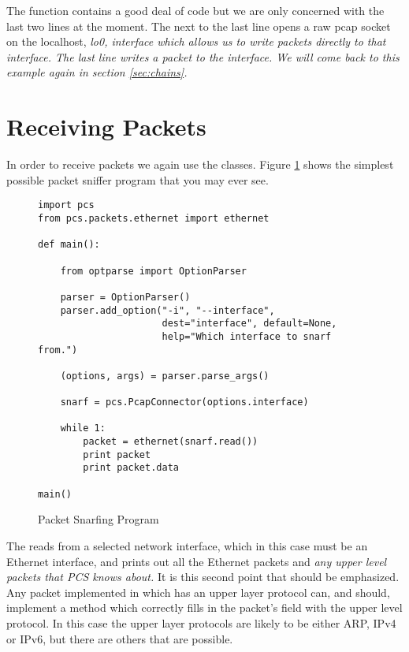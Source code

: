 \documentclass[11pt]{article}
\begin{document}
The  function contains a good deal of code
but we are only concerned with the last two lines at the moment.  The
next to the last line opens a raw pcap socket on the localhost,
\em{lo0}, interface which allows us to write packets directly to that
interface.  The last line writes a packet to the interface.  We will
come back to this example again in section \ref{sec:chains}.

\section{Receiving Packets}
\label{sec:receiving-packets}

In order to receive packets we again use the 
classes.  Figure \ref{fig:packet-snarfing-program} shows the simplest
possible packet sniffer program that you may ever see.

\begin{figure}
  \centering
\begin{verbatim}
import pcs
from pcs.packets.ethernet import ethernet

def main():

    from optparse import OptionParser

    parser = OptionParser()
    parser.add_option("-i", "--interface",
                      dest="interface", default=None,
                      help="Which interface to snarf from.")
    
    (options, args) = parser.parse_args()

    snarf = pcs.PcapConnector(options.interface)

    while 1:
        packet = ethernet(snarf.read())
        print packet
        print packet.data
        
main()
\end{verbatim}
  \caption{Packet Snarfing Program}
  \label{fig:packet-snarfing-program}
\end{figure}

The  reads from a selected network interface, which
in this case must be an Ethernet interface, and prints out all the
Ethernet packets and \emph{any upper level packets that PCS knows
  about.}  It is this second point that should be emphasized.  Any
packet implemented in  which has an upper layer protocol
can, and should, implement a  method which correctly
fills in the packet's  field with the upper level
protocol.  In this case the upper layer protocols are likely to be
either ARP, IPv4 or IPv6, but there are others that are possible.
\end{document}
